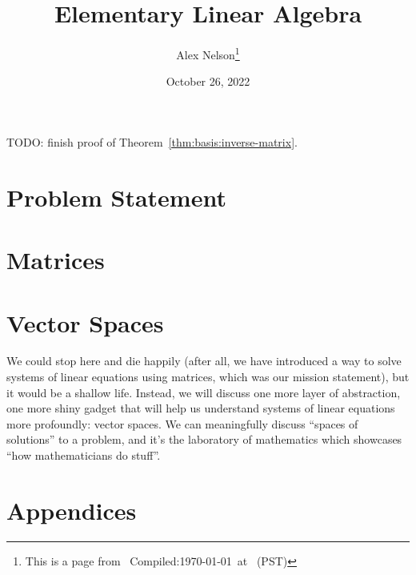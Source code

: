 \documentclass{article}
\title{Elementary Linear Algebra}
\author{Alex Nelson\thanks{This is a page from \homeurl{}\hfil\break\indent\;\, Compiled:\enspace\today\ at \currenttime\ (PST)}}
\date{October 26, 2022}
\begin{document}
\maketitle
TODO: finish proof of Theorem~\ref{thm:basis:inverse-matrix}.

\tableofcontents


\part{Problem Statement}

\part{Matrices}\label{part:matrices}




% 

\vfill\eject
\part{Vector Spaces}

We could stop here and die happily (after all, we have introduced a way
to solve systems of linear equations using matrices, which was our
mission statement), but it would be a shallow
life. Instead, we will discuss one more layer of abstraction, one more
shiny gadget that will help us understand systems of linear equations
more profoundly: vector spaces. We can meaningfully discuss ``spaces of
solutions'' to a problem, and it's the laboratory of mathematics which
showcases ``how mathematicians do stuff''.








\vfill\eject
\part{Appendices}
\appendix
%
\vfill\eject

\end{document}
